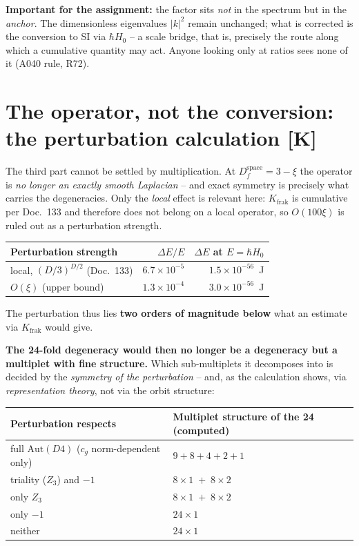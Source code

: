 \textbf{Important for the assignment:} the factor sits \emph{not}
in the spectrum but in the \emph{anchor}. The dimensionless
eigenvalues $|k|^2$ remain unchanged; what is corrected is the
conversion to SI via $\hbar H_0$ -- a scale bridge, that is,
precisely the route along which a cumulative quantity may act.
Anyone looking only at ratios sees none of it (A040 rule, R72).

\section{The operator, not the conversion: the perturbation calculation [K]}

The third part cannot be settled by multiplication. At
$D_f^\text{space} = 3-\xi$ the operator is \emph{no longer an
exactly smooth Laplacian} -- and exact symmetry is precisely what
carries the degeneracies. Only the \emph{local} effect is relevant
here: $K_\text{frak}$ is cumulative per Doc.~133 and therefore
does not belong on a local operator, so $O(100\xi)$ is ruled out
as a perturbation strength.

\begin{center}
\begin{tabular}{lrr}
\toprule
Perturbation strength & $\Delta E/E$ & $\Delta E$ at
  $E = \hbar H_0$ \\
\midrule
local, $(D/3)^{D/2}$ (Doc.~133) & $6.7\times10^{-5}$ &
  $1.5\times10^{-56}$~J \\
$O(\xi)$ (upper bound) & $1.3\times10^{-4}$ &
  $3.0\times10^{-56}$~J \\
\bottomrule
\end{tabular}
\end{center}

\noindent The perturbation thus lies \textbf{two orders of
magnitude below} what an estimate via $K_\text{frak}$ would
give.

\noindent \textbf{The 24-fold degeneracy would then no longer be a
degeneracy but a multiplet with fine structure.} Which
sub-multiplets it decomposes into is decided by the \emph{symmetry
of the perturbation} -- and, as the calculation shows, via
\emph{representation theory}, not via the orbit structure:

\begin{center}
\begin{tabular}{ll}
\toprule
Perturbation respects & Multiplet structure of the 24 (computed) \\
\midrule
full $\text{Aut}(D4)$ ($c_g$ norm-dependent only) &
  $9 + 8 + 4 + 2 + 1$ \\
triality ($Z_3$) and $-1$ & $8\times1 \;+\; 8\times2$ \\
only $Z_3$ & $8\times1 \;+\; 8\times2$ \\
only $-1$ & $24\times1$ \\
neither & $24\times1$ \\
\bottomrule
\end{tabular}
\end{center}

